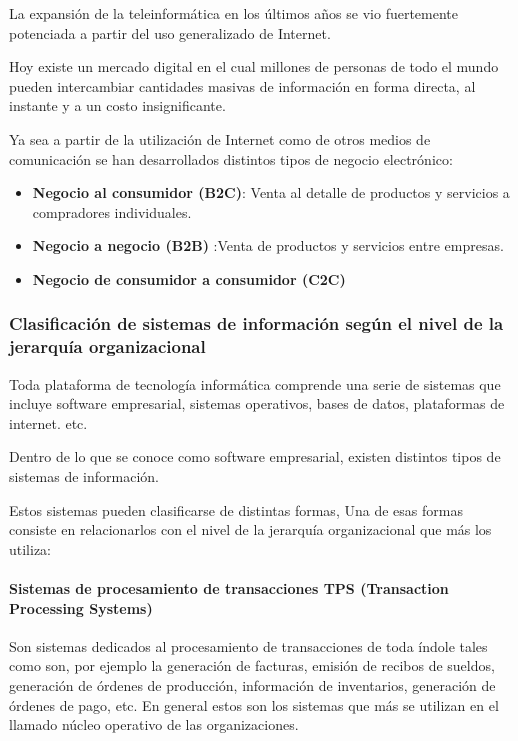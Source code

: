 \documentclass[a4paper, 12pt]{article}
\begin{document}
La expansión de la teleinformática en los últimos años se vio fuertemente potenciada a partir del uso generalizado de Internet.

Hoy existe un mercado digital en el cual millones de personas de todo el mundo pueden intercambiar cantidades masivas de información en forma directa, al instante y a un costo insignificante.

Ya sea a partir de la utilización de Internet como de otros medios de comunicación se han desarrollados distintos tipos de negocio electrónico:

\begin{itemize}
    \item \textbf{Negocio al consumidor (B2C)}:  Venta al detalle de productos y servicios a compradores individuales.
    
    \item \textbf{Negocio a negocio (B2B)} :Venta de productos y servicios entre empresas.
    
    \item \textbf{Negocio de consumidor a consumidor (C2C)}
\end{itemize}


\subsubsection{Clasificación de	sistemas de información según el nivel de la jerarquía organizacional}
\label{ClasificacionJerarquia}

Toda plataforma de tecnología informática comprende una serie de sistemas que incluye software empresarial, sistemas operativos, bases de datos, plataformas de internet. etc.

Dentro de lo que se conoce como software empresarial, existen distintos tipos de sistemas de información.

Estos sistemas pueden clasificarse de distintas formas, Una de esas formas consiste en relacionarlos con el nivel de la jerarquía organizacional que más los utiliza:

\paragraph{Sistemas de procesamiento de transacciones TPS (Transaction Processing Systems)}

Son sistemas dedicados al procesamiento de transacciones de toda índole tales como son, por ejemplo la generación de facturas, emisión de recibos de sueldos, generación de órdenes de producción, información de inventarios, generación de órdenes de pago, etc. En general estos son los sistemas que más se utilizan en el llamado núcleo operativo de las organizaciones.
\end{document}
